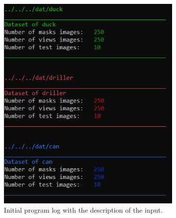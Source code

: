 \documentclass{article}
\begin{document}
\begin{figure}[H]
\begin{subfigure}{.5\textwidth}
  \centering
  \includegraphics[width=.9\linewidth]{Images/parallel_init.png}
\caption{Initial program log with the description of the input.}
\end{subfigure}
\begin{subfigure}{.5\textwidth}
  \centering

\end{subfigure}
\end{figure}
\end{document}
